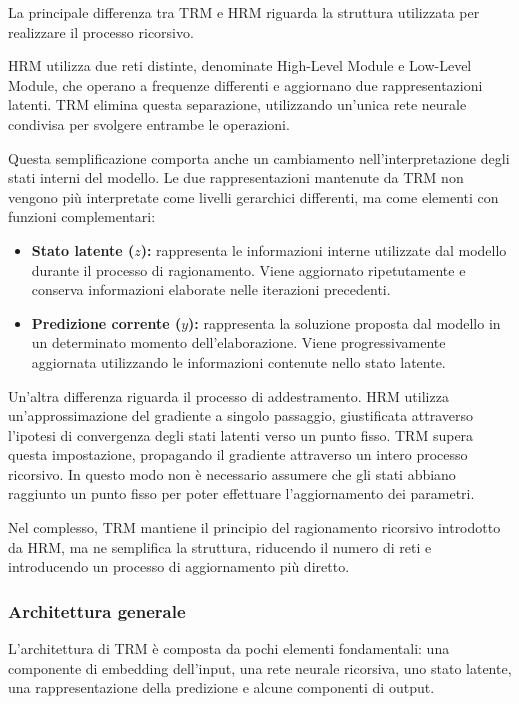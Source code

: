 La principale differenza tra TRM e HRM riguarda la struttura utilizzata per realizzare il processo ricorsivo.

HRM utilizza due reti distinte, denominate High-Level Module e Low-Level Module, che operano a frequenze differenti e aggiornano due rappresentazioni latenti. TRM elimina questa separazione, utilizzando un'unica rete neurale condivisa per svolgere entrambe le operazioni.

Questa semplificazione comporta anche un cambiamento nell'interpretazione degli stati interni del modello. Le due rappresentazioni mantenute da TRM non vengono più interpretate come livelli gerarchici differenti, ma come elementi con funzioni complementari:

\begin{itemize}
    \item \textbf{Stato latente (\(z\)):} rappresenta le informazioni interne utilizzate dal modello durante il processo di ragionamento. Viene aggiornato ripetutamente e conserva informazioni elaborate nelle iterazioni precedenti.
    \item \textbf{Predizione corrente (\(y\)):} rappresenta la soluzione proposta dal modello in un determinato momento dell'elaborazione. Viene progressivamente aggiornata utilizzando le informazioni contenute nello stato latente.
\end{itemize}

Un'altra differenza riguarda il processo di addestramento. HRM utilizza un'approssimazione del gradiente a singolo passaggio, giustificata attraverso l'ipotesi di convergenza degli stati latenti verso un punto fisso. TRM supera questa impostazione, propagando il gradiente attraverso un intero processo ricorsivo. In questo modo non è necessario assumere che gli stati abbiano raggiunto un punto fisso per poter effettuare l'aggiornamento dei parametri.

Nel complesso, TRM mantiene il principio del ragionamento ricorsivo introdotto da HRM, ma ne semplifica la struttura, riducendo il numero di reti e introducendo un processo di aggiornamento più diretto.

\subsubsection{Architettura generale}

L'architettura di TRM è composta da pochi elementi fondamentali: una componente di embedding dell'input, una rete neurale ricorsiva, uno stato latente, una rappresentazione della predizione e alcune componenti di output.


